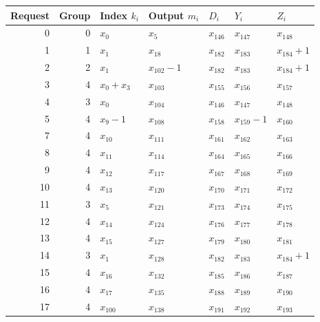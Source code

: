 \begin{center}\small
\begin{tabular}{rrlllll}
\toprule
Request & Group & Index $k_i$ & Output $m_i$ & $D_i$ & $Y_i$ & $Z_i$\\
\midrule
0 & 0 & $x_0$ & $x_5$ & $x_{146}$ & $x_{147}$ & $x_{148}$\\
1 & 1 & $x_1$ & $x_{18}$ & $x_{182}$ & $x_{183}$ & $x_{184}+1$\\
2 & 2 & $x_1$ & $x_{102}-1$ & $x_{182}$ & $x_{183}$ & $x_{184}+1$\\
3 & 4 & $x_0+x_3$ & $x_{103}$ & $x_{155}$ & $x_{156}$ & $x_{157}$\\
4 & 3 & $x_0$ & $x_{104}$ & $x_{146}$ & $x_{147}$ & $x_{148}$\\
5 & 4 & $x_9-1$ & $x_{108}$ & $x_{158}$ & $x_{159}-1$ & $x_{160}$\\
7 & 4 & $x_{10}$ & $x_{111}$ & $x_{161}$ & $x_{162}$ & $x_{163}$\\
8 & 4 & $x_{11}$ & $x_{114}$ & $x_{164}$ & $x_{165}$ & $x_{166}$\\
9 & 4 & $x_{12}$ & $x_{117}$ & $x_{167}$ & $x_{168}$ & $x_{169}$\\
10 & 4 & $x_{13}$ & $x_{120}$ & $x_{170}$ & $x_{171}$ & $x_{172}$\\
11 & 3 & $x_5$ & $x_{121}$ & $x_{173}$ & $x_{174}$ & $x_{175}$\\
12 & 4 & $x_{14}$ & $x_{124}$ & $x_{176}$ & $x_{177}$ & $x_{178}$\\
13 & 4 & $x_{15}$ & $x_{127}$ & $x_{179}$ & $x_{180}$ & $x_{181}$\\
14 & 3 & $x_1$ & $x_{128}$ & $x_{182}$ & $x_{183}$ & $x_{184}+1$\\
15 & 4 & $x_{16}$ & $x_{132}$ & $x_{185}$ & $x_{186}$ & $x_{187}$\\
16 & 4 & $x_{17}$ & $x_{135}$ & $x_{188}$ & $x_{189}$ & $x_{190}$\\
17 & 4 & $x_{100}$ & $x_{138}$ & $x_{191}$ & $x_{192}$ & $x_{193}$\\
\bottomrule
\end{tabular}
\end{center}
